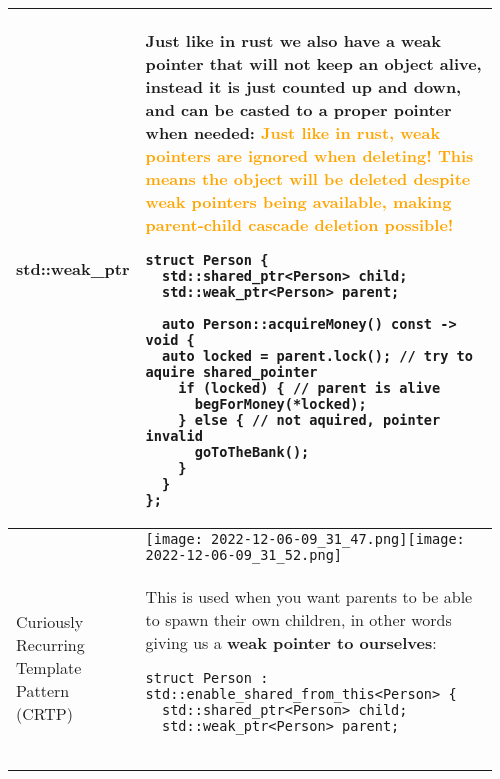 \documentclass[main.tex,fontsize=8pt,paper=a4,paper=portrait,DIV=calc,]{scrartcl}
\begin{document}
\pagebreak
\begin{table}[ht!]
\begin{tabular}{|m{0.2\linewidth}|m{0.755\linewidth}|}
\hline
std::weak\_ptr & 
Just like in rust we also have a weak pointer that will not keep an object alive, instead it is just counted up and down, and can be casted to a proper pointer when needed:\newline
\textcolor{orange}{Just like in rust, weak pointers are ignored when deleting! This means the object will be deleted despite weak pointers being available, making parent-child cascade deletion possible!}\newline
\begin{lstlisting}
struct Person {
  std::shared_ptr<Person> child;
  std::weak_ptr<Person> parent;

  auto Person::acquireMoney() const -> void {
  auto locked = parent.lock(); // try to aquire shared_pointer
    if (locked) { // parent is alive
      begForMoney(*locked);
    } else { // not aquired, pointer invalid
      goToTheBank();
    }
  }
};
\end{lstlisting} \\
\hline
& 
\texttt{[image: 2022-12-06-09\_31\_47.png]}\texttt{[image: 2022-12-06-09\_31\_52.png]}\\
\hline
Curiously Recurring Template Pattern (CRTP) & 
This is used when you want parents to be able to spawn their own children, in other words giving us a \textbf{weak pointer to ourselves}:\newline
\begin{lstlisting}
struct Person : std::enable_shared_from_this<Person> {
  std::shared_ptr<Person> child;
  std::weak_ptr<Person> parent;


\end{lstlisting}
\end{tabular}
\end{table}
\end{document}
